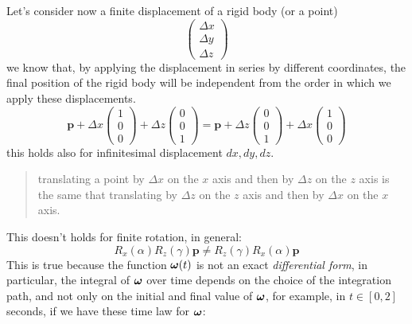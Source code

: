 \documentclass[10pt, letterpaper]{report}
\begin{document}
Let's consider now a finite displacement of a rigid body (or a point)\begin{equation}
    \begin{pmatrix}
        \Delta x\\\Delta y\\ \Delta z
    \end{pmatrix}
\end{equation}
we know that, by applying the displacement in series by different coordinates, the final position of the rigid body will be independent from the order in which we apply these displacements.\begin{equation}
    \mathbf p +  \Delta x\begin{pmatrix}
        1\\0\\ 0
    \end{pmatrix}
    +  \Delta z\begin{pmatrix}
        0\\0\\ 1
    \end{pmatrix}
    =
      \mathbf p +  \Delta z\begin{pmatrix}
        0\\0\\ 1
    \end{pmatrix}
    +  \Delta x\begin{pmatrix}
        1\\0\\ 0
    \end{pmatrix}
\end{equation}
this holds also for infinitesimal displacement $dx,dy,dz$.\begin{quotation}
    translating a point by $\Delta x$ on the $x$ axis and then by $\Delta z$ on the $z$ axis is the same that translating by $\Delta z$ on the $z$ axis and then by $\Delta x$ on the $x$ axis.
\end{quotation}
This doesn't holds for finite rotation, in general:\begin{equation}
    R_x(\alpha)R_z(\gamma)\mathbf p \ne R_z(\gamma)R_x(\alpha)\mathbf p
\end{equation}
This is true because the function ${\boldsymbol{\omega}}(t)$ is not an exact \textit{differential form}, in particular, the integral of ${\boldsymbol{\omega}}$ over time depends on the choice of the integration path, and not only on the initial and final value of ${\boldsymbol{\omega}}$, for example, in $t\in [0,2]$ seconds, if we have these time law for ${\boldsymbol{\omega}}$:
\end{document}
